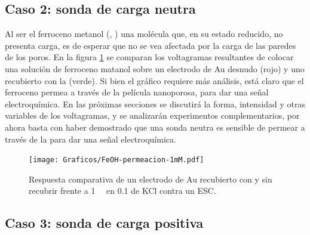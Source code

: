 	\subsection{Caso 2: sonda de carga neutra}

		Al ser el ferroceno metanol (\ferroceno, \fc) una molécula que, en su estado reducido, no presenta carga, es de esperar que no se vea afectada por la carga de las paredes de los poros. En la figura \ref{fig:permeacion} se comparan los voltagramas resultantes de colocar una solución de ferroceno matanol sobre un electrodo de Au desnudo (rojo) y uno recubierto con la \pdm\space (verde).  Si bien el gráfico  requiere más análisis, está claro que el ferroceno permea a través de la película nanoporosa, para dar una señal electroquímica. En las próximas secciones se discutirá la forma, intensidad y otras variables de los voltagramas, y se analizarán experimentos complementarios, por ahora basta con haber demostrado que una sonda neutra es sensible de permear a través de la \pdm\space para dar una señal electroquímica.

		\begin{figure}[ht]
				\centering
		 	    \texttt{[image: Graficos/FeOH-permeacion-1mM.pdf]}
		        \caption[Permeación ferroceno metanol en \pdmF]{Respuesta comparativa de un electrodo de Au recubierto con \pdmF\space y sin recubrir frente a \fc\space \SI{1}{\milli\Molar} en \SI{0.1}{\Molar} de KCl contra un ESC.}
		        \label{fig:permeacion}
		      	\end{figure}

	\subsection{Caso 3: sonda de carga positiva}

